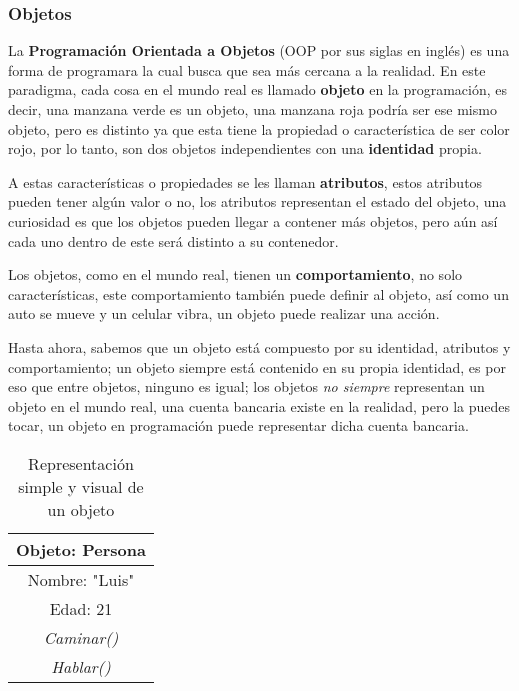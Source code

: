 \subsubsection{Objetos}

La \textbf{Programación Orientada a Objetos} (OOP por sus siglas en inglés) es una forma de programara la cual busca que sea más cercana a la realidad. En este paradigma, cada cosa en el mundo real es llamado \textbf{objeto} en la programación, es decir, una manzana verde es un objeto, una manzana roja podría ser ese mismo objeto, pero es distinto ya que esta tiene la propiedad o característica de ser color rojo, por lo tanto, son dos objetos independientes con una \textbf{identidad} propia.

A estas características o propiedades se les llaman \textbf{atributos}, estos atributos pueden tener algún valor o  no, los atributos representan el estado del objeto, una curiosidad es que los objetos pueden llegar a contener más objetos, pero aún así cada uno dentro de este será distinto a su contenedor.

Los objetos, como en el mundo real, tienen un \textbf{comportamiento}, no solo características, este comportamiento también puede definir al objeto, así como un auto se mueve y un celular vibra, un objeto puede realizar una acción.

Hasta ahora, sabemos que un objeto está compuesto por su identidad, atributos y comportamiento; un objeto siempre está contenido en su propia identidad, es por eso que entre objetos, ninguno es igual; los objetos \textit{no siempre} representan un objeto en el mundo real, una cuenta bancaria existe en la realidad, pero la puedes tocar, un objeto en programación puede representar dicha cuenta bancaria.
\begin{table}[H]
    \begin{center}
        \caption{Representación simple y visual de un objeto}
        \label{tab: 7}
        \begin{tabular}{|c|}
            \hline
            \textbf{Objeto: Persona} \\
            \hline
            Nombre: "Luis" \\
            Edad: 21 \\
            \hline
            \textit{Caminar()} \\
            \textit{Hablar()} \\
            \hline
        \end{tabular}
    \end{center}
\end{table}


